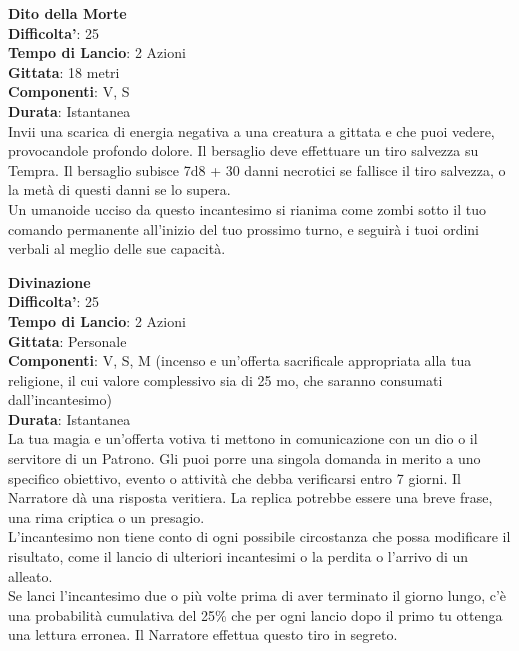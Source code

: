 \begin{multicols}{2}
\medskip\textbf{Dito della Morte}\\
\textbf{Difficolta'}: 25\\
\textbf{Tempo di Lancio}: 2 Azioni\\
\textbf{Gittata}: 18 metri\\
\textbf{Componenti}: V, S\\
\textbf{Durata}: Istantanea\\
Invii una scarica di energia negativa a una creatura a gittata e che puoi vedere, provocandole profondo dolore. Il bersaglio deve effettuare un tiro salvezza su Tempra. Il bersaglio subisce 7d8 + 30 danni necrotici se fallisce il tiro salvezza, o la metà di questi danni se lo supera.\\
Un umanoide ucciso da questo incantesimo si rianima come zombi sotto il tuo comando permanente all’inizio del tuo prossimo turno, e seguirà i tuoi ordini verbali al meglio delle sue capacità.


\medskip\textbf{Divinazione}\\
\textbf{Difficolta'}: 25\\
\textbf{Tempo di Lancio}: 2 Azioni\\
\textbf{Gittata}: Personale\\
\textbf{Componenti}: V, S, M (incenso e un’offerta sacrificale appropriata alla tua religione, il cui valore complessivo sia di 25 mo, che saranno consumati dall’incantesimo)\\
\textbf{Durata}: Istantanea\\
La tua magia e un’offerta votiva ti mettono in comunicazione con un dio o il servitore di un Patrono. Gli puoi porre una singola domanda in merito a uno specifico obiettivo, evento o attività che debba verificarsi entro 7 giorni. Il Narratore dà una risposta veritiera. La replica potrebbe essere una breve frase, una rima criptica o un presagio. \\
L’incantesimo non tiene conto di ogni possibile circostanza che possa modificare il risultato, come il lancio di ulteriori incantesimi o la perdita o l’arrivo di un alleato.\\
Se lanci l’incantesimo due o più volte prima di aver terminato il giorno lungo, c’è una probabilità cumulativa del 25\% che per ogni lancio dopo il primo tu ottenga una lettura erronea. Il Narratore effettua questo tiro in segreto. 


\end{multicols}
